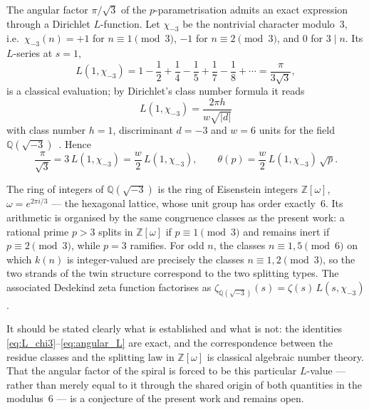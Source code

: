 \begin{remark}
\label{rem:eisenstein_L}
The angular factor $\pi/\sqrt{3}$ of the $p$-parametrisation admits an
exact expression through a Dirichlet $L$-function. Let $\chi_{-3}$ be
the nontrivial character modulo~$3$, i.e.\ $\chi_{-3}(n) = +1$ for
$n \equiv 1 \pmod 3$, $-1$ for $n \equiv 2 \pmod 3$, and $0$ for
$3 \mid n$. Its $L$-series at $s=1$,
\begin{equation}\label{eq:L_chi3}
  L(1,\chi_{-3})
  = 1 - \frac12 + \frac14 - \frac15 + \frac17 - \frac18 + \cdots
  = \frac{\pi}{3\sqrt{3}},
\end{equation}
is a classical evaluation; by Dirichlet's class number formula it reads
\[
  L(1,\chi_{-3}) = \frac{2\pi h}{w\sqrt{|d|}}
\]
with class number $h = 1$, discriminant $d = -3$ and $w = 6$ units for
the field $\mathbb{Q}(\sqrt{-3})$~\cite{IrelandRosen1990}. Hence
\begin{equation}\label{eq:angular_L}
  \frac{\pi}{\sqrt{3}} = 3\,L(1,\chi_{-3}) = \frac{w}{2}\,L(1,\chi_{-3}),
  \qquad
  \theta(p) = \frac{w}{2}\,L(1,\chi_{-3})\,\sqrt{p}.
\end{equation}

The ring of integers of $\mathbb{Q}(\sqrt{-3})$ is the ring of
Eisenstein integers $\mathbb{Z}[\omega]$, $\omega = e^{2\pi i/3}$ ---
the hexagonal lattice, whose unit group has order exactly~$6$. Its
arithmetic is organised by the same congruence classes as the present
work: a rational prime $p > 3$ splits in $\mathbb{Z}[\omega]$ if
$p \equiv 1 \pmod 3$ and remains inert if $p \equiv 2 \pmod 3$, while
$p = 3$ ramifies. For odd $n$, the classes $n \equiv 1, 5 \pmod 6$ on
which $k(n)$ is integer-valued are precisely the classes
$n \equiv 1, 2 \pmod 3$, so the two strands of the twin structure
correspond to the two splitting types. The associated Dedekind zeta
function factorises as
$\zeta_{\mathbb{Q}(\sqrt{-3})}(s) = \zeta(s)\,L(s,\chi_{-3})$.

It should be stated clearly what is established and what is not: the
identities \eqref{eq:L_chi3}--\eqref{eq:angular_L} are exact, and the
correspondence between the residue classes and the splitting law in
$\mathbb{Z}[\omega]$ is classical algebraic number theory. That the
angular factor of the spiral is forced to be this particular $L$-value
--- rather than merely equal to it through the shared origin of both
quantities in the modulus~$6$ --- is a conjecture of the present work
and remains open.
\end{remark}

